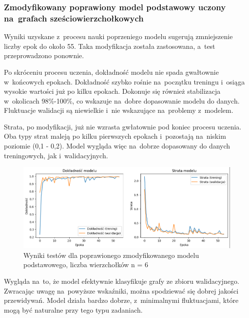 
\subsubsection{Zmodyfikowany poprawiony model podstawowy uczony na~grafach sześciowierzchołkowych}

Wyniki uzyskane z~procesu nauki poprzeniego modelu sugerują zmniejszenie liczby epok do około 55.
Taka modyfikacja została zastosowana, a~test przeprowadzono ponownie.

Po skróceniu procesu uczenia, dokładność modelu nie spada gwałtownie w~końcowych epokach.
Dokładność szybko rośnie na~początku treningu i~osiąga wysokie wartości już po kilku epokach.
Dokonuje się również stabilizacja w~okolicach 98\%-100\%, co wskazuje na~dobre dopasowanie modelu do danych.
Fluktuacje walidacji są niewielkie i~nie wskazujące na~problemy z~modelem.

Strata, po modyfikacji, już nie wzrasta gwłatownie pod koniec procesu uczenia.
Oba typy strat maleją po kilku pierwszych epokach i~pozostają na~niskim poziomie (0,1 - 0,2).
Model wygląda więc na~dobrze dopasowany do danych treningowych, jak i~walidacyjnych.

\begin{figure}[ht]
	\centering
	\includegraphics[width=15.5cm]{resources/tests/images/v4/base6_1_1_img.png}
	\caption{Wyniki testów dla poprawionego zmodyfikowanego modelu podstawowego, liczba wierzchołków n = 6}
	\label{Fig:tests-best-1a}
\end{figure}
\FloatBarrier

Wygląda na~to, że model efektywnie klasyfikuje grafy ze zbioru walidacyjnego.
Zwracając uwagę na~powyższe wskaźniki, można spodziewać się dobrej jakości przewidywań.
Model działa bardzo dobrze, z~minimalnymi fluktuacjami, które mogą być naturalne przy tego typu zadaniach.

